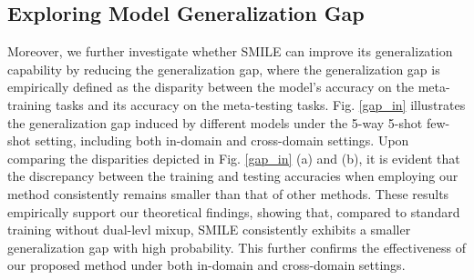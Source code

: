 \begin{figure*}
\renewcommand{\thefigure}{S1}
    \centering
    \caption{Model performance varies with the values of the mixup hyperparameters $\alpha$ and $\beta$.}
    \label{mixup_hyper}
\end{figure*}

\subsection{Exploring Model Generalization Gap}
\begin{figure*}[ht]
\renewcommand{\thefigure}{S2}
    \centering
    \caption{(a) Generalization gap over several methods on the Amazon-Clothing dataset under the 5-way 5-shot 5 tasks setting. (b) Generalization gap over several methods on the Amazon-Clothing dataset under the 5-way 5-shot 5 tasks setting.}
    \label{gap_in}
\end{figure*}

Moreover, we further investigate whether SMILE can improve its generalization capability by reducing the generalization gap, where the generalization gap is empirically defined as the disparity between the model's accuracy on the meta-training tasks and its accuracy on the meta-testing tasks. Fig. \ref{gap_in} illustrates the generalization gap induced by different models under the 5-way 5-shot few-shot setting, including both in-domain and cross-domain settings. Upon comparing the disparities depicted in Fig. \ref{gap_in} (a) and (b), it is evident that the discrepancy between the training and testing accuracies when employing our method consistently remains smaller than that of other methods. These results empirically support our theoretical findings, showing that, compared to standard training without dual-levl mixup, SMILE consistently exhibits a smaller generalization gap with high probability. This further confirms the effectiveness of our proposed method under both in-domain and cross-domain settings.


